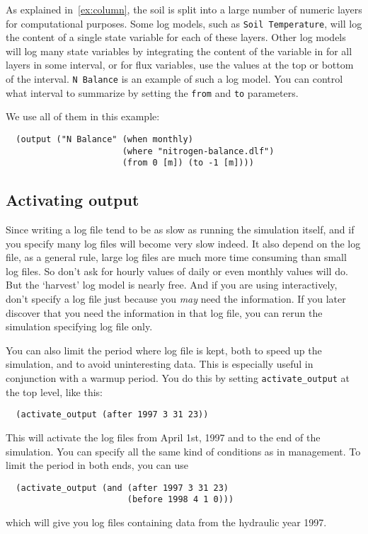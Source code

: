 \documentclass[a4paper,11pt]{article}
\begin{document}
As explained in~\ref{ex:column}, the soil is split into a large number
of numeric layers for computational purposes.  Some log models, such
as \texttt{Soil Temperature}, will log the content of a single state
variable for each of these layers.  Other log models will log many
state variables by integrating the content of the variable in for all
layers in some interval, or for flux variables, use the values at the
top or bottom of the interval.  \texttt{N Balance} is an example of
such a log model.  You can control what interval to summarize by
setting the \texttt{from} and \texttt{to} parameters.

We use all of them in this example:
\begin{verbatim}
  (output ("N Balance" (when monthly)
                       (where "nitrogen-balance.dlf")
                       (from 0 [m]) (to -1 [m])))
\end{verbatim}

\subsection{Activating output}
\label{sec:actout}

Since writing a log file tend to be as slow as running the
simulation itself, and if you specify many log files \daisy{} will
become very slow indeed.  It also depend on the log file, as a general
rule, large log files are much more time consuming than small log
files.  So don't ask for hourly values of daily or even monthly values
will do.  But the `harvest' log model is nearly free.  And if you are
using \daisy{} interactively, don't specify a log file just because
you \emph{may} need the information.  If you later discover that you
need the information in that log file, you can rerun the simulation
specifying log file only.

You can also limit the period where log file is kept, both to speed up
the simulation, and to avoid uninteresting data.  This is
especially useful in conjunction with a warmup period.  You do this by
setting \texttt{activate\_output} at the top level, like this:
\begin{verbatim}
  (activate_output (after 1997 3 31 23))
\end{verbatim}
This will activate the log files from April 1st, 1997 and to the end
of the simulation.  You can specify all the same kind of conditions as
in management.  To limit the period in both ends, you can use
\begin{verbatim}
  (activate_output (and (after 1997 3 31 23) 
                        (before 1998 4 1 0)))
\end{verbatim}
which will give you log files containing data from the hydraulic year
1997. 
\end{document}

